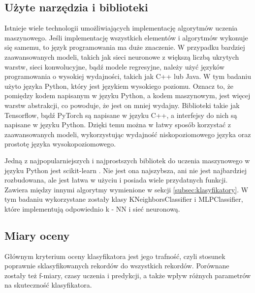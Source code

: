 \subsection{Użyte narzędzia i biblioteki}\label{subsec:narzedziaibiblioteki}
Istnieje wiele technologii umożliwiających implementację algorytmów uczenia maszynowego. 
Jeśli implementację wszystkich elementów i algorytmów wykonuje się samemu, to język programowania ma duże znaczenie.
W przypadku bardziej zaawansowanych modeli, takich jak sieci neuronowe z większą liczbą ukrytych warstw, sieci konwolucyjne, bądź modele regresyjne, należy użyć języków programowania o wysokiej wydajności, takich jak C++ lub Java. W tym badaniu użyto języka Python, który jest językiem wysokiego poziomu. Oznacz to, że pomiędzy kodem napisanym w języku Python, a kodem maszynowym, jest więcej warstw abstrakcji, co powoduje, że jest on mniej wydajny. Biblioteki takie jak Tensorflow, bądź PyTorch są napisane w języku C++, a interfejsy do nich są napisane w języku Python. Dzięki temu można w łatwy sposób korzystać z zaawansowanych modeli, wykorzystując wydajność niskopoziomowego języka oraz prostotę języka wysokopoziomowego.

Jedną z najpopularniejszych i najprostszych bibliotek do uczenia maszynowego w języku Python jest scikit-learn\cite{scikit-learn} . Nie jest ona najszybsza, ani nie jest najbardziej rozbudowana, ale jest łatwa w użyciu i posiada wiele przydatnych funkcji.
Zawiera między innymi algorytmy wymienione w sekcji \ref{subsec:klasyfikatory}. W tym badaniu wykorzystane zostały klasy KNeighborsClassifier i MLPClassifier, które implementują odpowiednio k - NN i sieć neuronową. 

\subsection{Miary oceny}\label{subsec:miaryoceny}
Głównym kryterium oceny klasyfikatora jest jego trafność, 
czyli stosunek poprawnie sklasyfikowanych rekordów do wszystkich rekordów.
Porównane zostały też f-miary, czasy uczenia i predykcji, a także wpływ różnych parametrów na skuteczność klasyfikatora.
